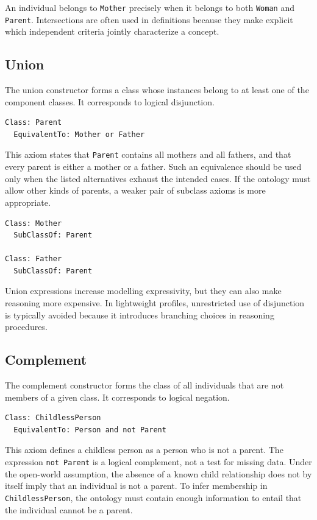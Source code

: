 \documentclass{scrbook}
\begin{document}
	An individual belongs to \texttt{Mother} precisely when it belongs to both \texttt{Woman} and \texttt{Parent}. Intersections are often used in definitions because they make explicit which independent criteria jointly characterize a concept.
	
	\subsection{Union}
	
	The union constructor forms a class whose instances belong to at least one of the component classes. It corresponds to logical disjunction.
	
	\begin{lstlisting}
Class: Parent
  EquivalentTo: Mother or Father
	\end{lstlisting}
	
	This axiom states that \texttt{Parent} contains all mothers and all fathers, and that every parent is either a mother or a father. Such an equivalence should be used only when the listed alternatives exhaust the intended cases. If the ontology must allow other kinds of parents, a weaker pair of subclass axioms is more appropriate.
	
	\begin{lstlisting}
Class: Mother
  SubClassOf: Parent

Class: Father
  SubClassOf: Parent
	\end{lstlisting}
	
	Union expressions increase modelling expressivity, but they can also make reasoning more expensive. In lightweight profiles, unrestricted use of disjunction is typically avoided because it introduces branching choices in reasoning procedures.
	
	\subsection{Complement}
	
	The complement constructor forms the class of all individuals that are not members of a given class. It corresponds to logical negation.
	
	\begin{lstlisting}
Class: ChildlessPerson
  EquivalentTo: Person and not Parent
	\end{lstlisting}
	
	This axiom defines a childless person as a person who is not a parent. The expression \texttt{not Parent} is a logical complement, not a test for missing data. Under the open-world assumption, the absence of a known child relationship does not by itself imply that an individual is not a parent. To infer membership in \texttt{ChildlessPerson}, the ontology must contain enough information to entail that the individual cannot be a parent.\\
	
\end{document}

